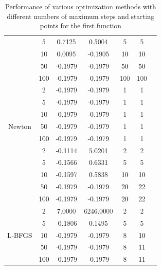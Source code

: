 \documentclass[9pt]{IEEEtran}
\begin{document}
\begin{table}[h!]
\begin{tabular}{|c|c|c|c|c|c|c|}
                                       & 5  & 0.7125   & 0.5004   & 5  & 5 \\ \cline{2-6} 
                                       & 10 & 0.0095   & -0.1905  & 10 & 10 \\ \cline{2-6} 
                                       & 50 & -0.1979  & -0.1979  & 50 & 50 \\ \cline{2-6} 
                                       & 100& -0.1979  & -0.1979  & 100 & 100 \\ \hline
        \multirow{7}{*}{Newton}          & 2  & -0.1979  & -0.1979  & 1  & 1 \\ \cline{2-6} 
                                       & 5  & -0.1979  & -0.1979  & 1  & 1 \\ \cline{2-6} 
                                       & 10 & -0.1979  & -0.1979  & 1  & 1 \\ \cline{2-6} 
                                       & 50 & -0.1979  & -0.1979  & 1  & 1 \\ \cline{2-6} 
                                       & 100& -0.1979  & -0.1979  & 1  & 1 \\ \hline
        \multirow{7}{*}{BFGS}            & 2  & -0.1114  & 5.0201   & 2  & 2 \\ \cline{2-6} 
                                       & 5  & -0.1566  & 0.6331   & 5  & 5 \\ \cline{2-6} 
                                       & 10 & -0.1597  & 0.5838   & 10 & 10 \\ \cline{2-6} 
                                       & 50 & -0.1979  & -0.1979  & 20 & 22 \\ \cline{2-6} 
                                       & 100& -0.1979  & -0.1979  & 20 & 22 \\ \hline
        \multirow{7}{*}{L-BFGS}          & 2  & 7.0000   & 6246.0000 & 2  & 2 \\ \cline{2-6} 
                                       & 5  & -0.1806  & 0.1495   & 5  & 5 \\ \cline{2-6} 
                                       & 10 & -0.1979  & -0.1979  & 8  & 10 \\ \cline{2-6} 
                                       & 50 & -0.1979  & -0.1979  & 8  & 11 \\ \cline{2-6} 
                                       & 100& -0.1979  & -0.1979  & 8  & 11 \\ \hline
    \end{tabular}
    \vspace{3pt}
    \caption{Performance of various optimization methods with different numbers of maximum steps and starting points for the first 
    function}
    \label{tab:f1}
\end{table}
\end{document}
